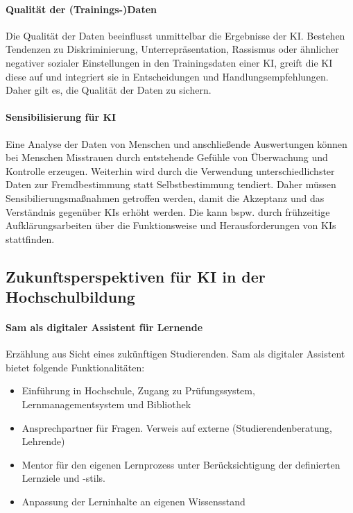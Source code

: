 \paragraph*{Qualität der (Trainings-)Daten} Die Qualität der Daten beeinflusst unmittelbar die Ergebnisse der KI. Bestehen Tendenzen zu Diskriminierung, Unterrepräsentation, Rassismus oder ähnlicher negativer sozialer Einstellungen in den Trainingsdaten einer KI, greift die KI diese auf und integriert sie in Entscheidungen und Handlungsempfehlungen. Daher gilt es, die Qualität der Daten zu sichern.

\paragraph*{Sensibilisierung für KI} Eine Analyse der Daten von Menschen und anschließende Auswertungen können  bei Menschen Misstrauen durch entstehende Gefühle von Überwachung und Kontrolle erzeugen. Weiterhin wird durch die Verwendung unterschiedlichster Daten zur Fremdbestimmung statt Selbstbestimmung tendiert. Daher müssen Sensibilierungsmaßnahmen getroffen werden, damit die Akzeptanz und das Verständnis gegenüber KIs erhöht werden. Die kann  bspw. durch frühzeitige Aufklärungsarbeiten über die Funktionsweise und Herausforderungen von KIs stattfinden.

\subsection{Zukunftsperspektiven für KI in der Hochschulbildung}

\paragraph*{Sam als digitaler Assistent für Lernende}
Erzählung aus Sicht eines zukünftigen Studierenden. Sam als digitaler Assistent bietet folgende Funktionalitäten:
\begin{itemize}
    \item Einführung in Hochschule, Zugang zu Prüfungssystem, Lernmanagementsystem und Bibliothek
    \item Ansprechpartner für Fragen. Verweis auf externe (Studierendenberatung, Lehrende)
    \item Mentor für den eigenen Lernprozess unter Berücksichtigung der definierten Lernziele und -stils.
    \item Anpassung der Lerninhalte an eigenen Wissensstand
\end{itemize}

